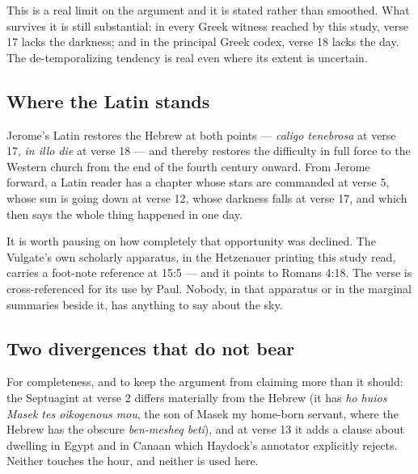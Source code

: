 This is a real limit on the argument and it is stated rather than smoothed. What
survives it is still substantial: in every Greek witness reached by this study,
verse 17 lacks the darkness; and in the principal Greek codex, verse 18 lacks the
day. The de-temporalizing tendency is real even where its extent is uncertain.

\subsection{Where the Latin stands}

Jerome's Latin restores the Hebrew at both points --- \textit{caligo tenebrosa}
at verse 17, \textit{in illo die} at verse 18 --- and thereby restores the
difficulty in full force to the Western church from the end of the fourth
century onward. From Jerome forward, a Latin reader has a chapter whose stars
are commanded at verse 5, whose sun is going down at verse 12, whose darkness
falls at verse 17, and which then says the whole thing happened in one day.

It is worth pausing on how completely that opportunity was declined. The
Vulgate's own scholarly apparatus, in the Hetzenauer printing this study read,
carries a foot-note reference at 15:5 --- and it points to Romans 4:18. The
verse is cross-referenced for its use by Paul. Nobody, in that apparatus or in
the marginal summaries beside it, has anything to say about the sky.

\subsection{Two divergences that do not bear}

For completeness, and to keep the argument from claiming more than it should:
the Septuagint at verse 2 differs materially from the Hebrew (it has
\textit{ho huios Masek tes oikogenous mou}, the son of Masek my home-born
servant, where the Hebrew has the obscure \textit{ben-mesheq beti}), and at verse
13 it adds a clause about dwelling in Egypt and in Canaan which Haydock's
annotator explicitly rejects. Neither
touches the hour, and neither is used here.
